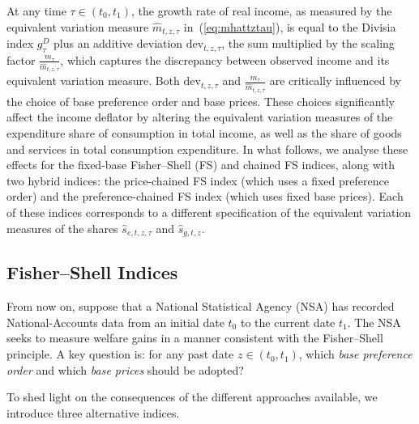 \documentclass[12pt,a4paper]{article}
\begin{document}
At any time \( \tau \in (t_0, t_1) \), the growth rate of real income, as measured by the equivalent variation measure \( \widehat{m}_{t,z,\tau} \) in~(\ref{eq:mhattztau}), is equal to the Divisia index \( g^D_\tau \) plus an additive deviation \( \text{dev}_{t,z,\tau} \), the sum multiplied by the scaling factor \( \frac{m_\tau}{\widehat{m}_{t,z,\tau}} \), which captures the discrepancy between observed income and its equivalent variation measure.  
Both \( \text{dev}_{t,z,\tau} \) and \( \frac{m_\tau}{\widehat{m}_{t,z,\tau}} \) are critically influenced by the choice of base preference order and base prices.  
These choices significantly affect the income deflator by altering the equivalent variation measures of the expenditure share of consumption in total income, as well as the share of goods and services in total consumption expenditure.  
In what follows, we analyse these effects for the fixed-base Fisher--Shell (FS) and chained FS indices, along with two hybrid indices: the price-chained FS index (which uses a fixed preference order) and the preference-chained FS index (which uses fixed base prices).  
Each of these indices corresponds to a different specification of the equivalent variation measures of the shares \( \widehat{s}_{e,t,z,\tau} \) and \( \widehat{s}_{g,t,z} \).



\subsection{Fisher–Shell Indices}

From now on, suppose that a National Statistical Agency (NSA) has recorded National-Accounts data from an initial date \(t_{0}\) to the current date \(t_{1}\).  
The NSA seeks to measure welfare gains in a manner consistent with the Fisher–Shell principle.  
A key question is: for any past date \(z\in(t_{0},t_{1})\), which \emph{base preference order} and which \emph{base prices} should be adopted?  

\noindent To shed light on the consequences of the different approaches available, we introduce three alternative indices. 
\end{document}

